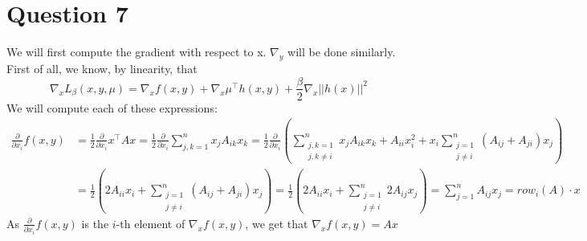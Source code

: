 \documentclass{article}
\newcommand{\R}{\mathbb{R}}
\newcommand{\tp}{^\top}
\newcommand{\p}{\frac{\partial}{\partial x_i}}
\begin{document}
\begin{comment}
So we may take $(x^*,  y^*) = (v_{\min }(A), v_{\min} (B))$, where $v_{\min }(A)$ and $v_{\min }(B)$ are the unit-normed eigenvectors of $\lambda_{\min}(A)$ and $\lambda_{\max}(B)$ respectively. \\
At this point, we need to recall that $(x^*,y^*)$ must belong to the set $S$, or equivalently we must have $h(x^*,y^*)=0$. By taking unit-normed eigenvectors, we ensure that $h_1(x^*,y^*)=0=h_2(x^*,y^*)$. The last condition is $h_3(x^*,y^*) = 0$. By definition of $h_3$, this means $(x^*)\tp y^* = 0$, i.e. $x^*$ and $y^*$ need to be orthogonal in $\R^n$. This is the only assumption we do not know, but observe that as soon as we know it the previous reasoning implies that the assumptions of the strong duality theorem are satisfied.\\

Hence, we can always find $\mu^*\in\R^3$ such that $(\text{A}2)$ is satisfied, but we cannot always ensure that $(\text{A}1)$ is satisfied. One condition that can ensure it however, is that the eigenvectors of $A$ and $B$ corresponding to their smallest eigenvalues are orthogonal. We can not expect to have this before solving the problem if we don't have specific informations about $A$ and $B$ other that them being symmetric.
\end{comment}



\section*{Question 7}


We will first compute the gradient with respect to x. $\nabla_y$ will be done similarly.\\
First of all, we know, by linearity, that 
$$\nabla_x L_{\beta}(x,y,\mu)=\nabla_x f(x,y) + \nabla_x \mu\tp h(x,y)+ \frac{\beta}{2} \nabla_x ||h(x)||^2$$
We will compute each of these expressions:\\
\begin{align*}
\p f(x,y)&=\frac{1}{2} \p x\tp A x=\frac{1}{2} \p \sum_{j,k=1}^n x_j A_{ik} x_k=\frac{1}{2} \p \left( \sum_{\substack{j,k=1\\ j,k\neq i}}^n x_j A_{ik} x_k+A_{ii}x_i^2+ x_i \sum_{\substack{j=1 \\ j\neq i}}^n (A_{ij}+A_{ji})x_j \right)\\
&=\frac{1}{2}\left( 2 A_{ii} x_i +  \sum_{\substack{j=1 \\ j\neq i}}^n (A_{ij}+A_{ji})x_j \right)=\frac{1}{2}\left( 2 A_{ii} x_i +  \sum_{\substack{j=1 \\ j\neq i}}^n 2 A_{ij}x_j \right)= \sum_{j=1}^n  A_{ij}x_j =row_i (A) \cdot x
\end{align*}
As $\p f(x,y)$ is the $i$-th element of $\nabla_x f(x,y)$, we get that $\nabla_x f(x,y)= Ax$ \\
\end{document}
